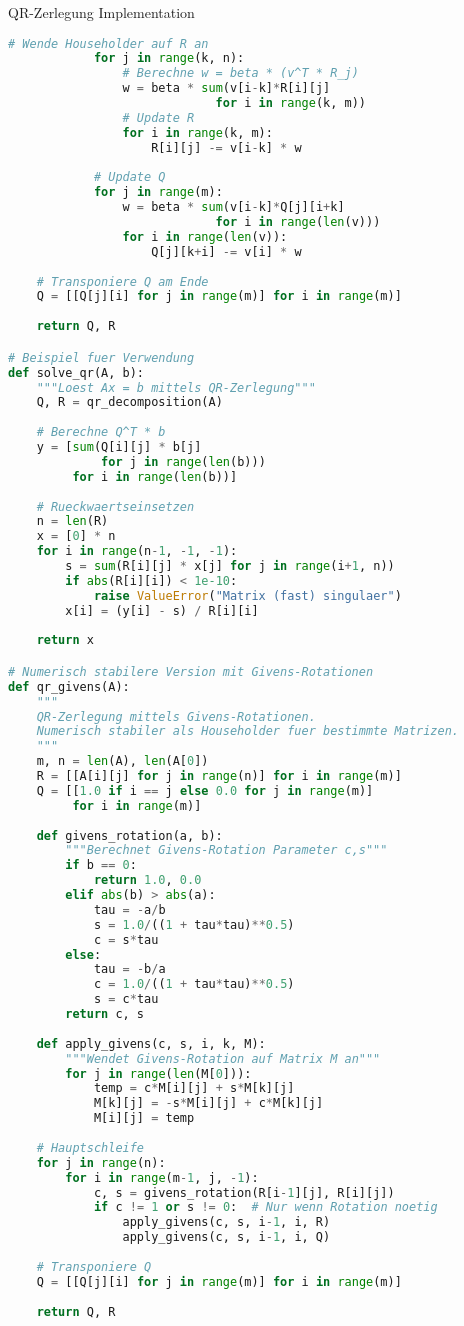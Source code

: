 \begin{examplecode}{QR-Zerlegung Implementation}
\begin{lstlisting}[language=Python, style=basesmol]
            # Wende Householder auf R an
            for j in range(k, n):
                # Berechne w = beta * (v^T * R_j)
                w = beta * sum(v[i-k]*R[i][j] 
                             for i in range(k, m))
                # Update R
                for i in range(k, m):
                    R[i][j] -= v[i-k] * w
            
            # Update Q
            for j in range(m):
                w = beta * sum(v[i-k]*Q[j][i+k] 
                             for i in range(len(v)))
                for i in range(len(v)):
                    Q[j][k+i] -= v[i] * w
    
    # Transponiere Q am Ende
    Q = [[Q[j][i] for j in range(m)] for i in range(m)]
    
    return Q, R

# Beispiel fuer Verwendung
def solve_qr(A, b):
    """Loest Ax = b mittels QR-Zerlegung"""
    Q, R = qr_decomposition(A)
    
    # Berechne Q^T * b
    y = [sum(Q[i][j] * b[j] 
             for j in range(len(b))) 
         for i in range(len(b))]
    
    # Rueckwaertseinsetzen
    n = len(R)
    x = [0] * n
    for i in range(n-1, -1, -1):
        s = sum(R[i][j] * x[j] for j in range(i+1, n))
        if abs(R[i][i]) < 1e-10:
            raise ValueError("Matrix (fast) singulaer")
        x[i] = (y[i] - s) / R[i][i]
    
    return x

# Numerisch stabilere Version mit Givens-Rotationen
def qr_givens(A):
    """
    QR-Zerlegung mittels Givens-Rotationen.
    Numerisch stabiler als Householder fuer bestimmte Matrizen.
    """
    m, n = len(A), len(A[0])
    R = [[A[i][j] for j in range(n)] for i in range(m)]
    Q = [[1.0 if i == j else 0.0 for j in range(m)] 
         for i in range(m)]
    
    def givens_rotation(a, b):
        """Berechnet Givens-Rotation Parameter c,s"""
        if b == 0:
            return 1.0, 0.0
        elif abs(b) > abs(a):
            tau = -a/b
            s = 1.0/((1 + tau*tau)**0.5)
            c = s*tau
        else:
            tau = -b/a
            c = 1.0/((1 + tau*tau)**0.5)
            s = c*tau
        return c, s
    
    def apply_givens(c, s, i, k, M):
        """Wendet Givens-Rotation auf Matrix M an"""
        for j in range(len(M[0])):
            temp = c*M[i][j] + s*M[k][j]
            M[k][j] = -s*M[i][j] + c*M[k][j]
            M[i][j] = temp
    
    # Hauptschleife
    for j in range(n):
        for i in range(m-1, j, -1):
            c, s = givens_rotation(R[i-1][j], R[i][j])
            if c != 1 or s != 0:  # Nur wenn Rotation noetig
                apply_givens(c, s, i-1, i, R)
                apply_givens(c, s, i-1, i, Q)
    
    # Transponiere Q
    Q = [[Q[j][i] for j in range(m)] for i in range(m)]
    
    return Q, R
\end{lstlisting}
\end{examplecode}


